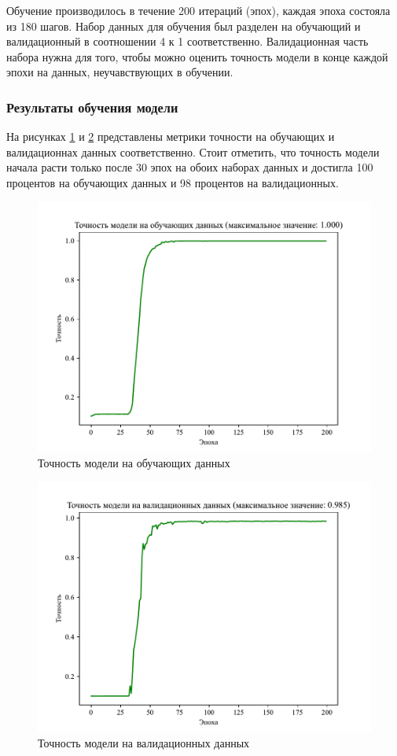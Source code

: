 Обучение производилось в течение 200 итераций (эпох), каждая эпоха состояла из 180 шагов. Набор данных для обучения был разделен на обучающий и валидационный в соотношении 4 к 1 соответственно. Валидационная часть набора нужна для того, чтобы можно оценить точность модели в конце каждой эпохи на данных, неучавствующих в обучении.

\subsubsection{Результаты обучения модели}
На рисунках \ref{fig:train_acc} и \ref{fig:val_acc} представлены метрики точности на обучающих и валидационнах данных соответственно. Стоит отметить, что точность модели начала расти только после 30 эпох на обоих наборах данных и достигла 100 процентов на обучающих данных и 98 процентов на валидационных.

\begin{figure}[hbtp]
	\centering
	\includegraphics[scale=0.8]{img/train_accuracy.pdf}
	\caption{Точность модели на обучающих данных}
	\label{fig:train_acc}
\end{figure}

\begin{figure}[hbtp]
	\centering
	\includegraphics[scale=0.8]{img/val_accuracy.pdf}
	\caption{Точность модели на валидационных данных}
	\label{fig:val_acc}
\end{figure}
\clearpage


